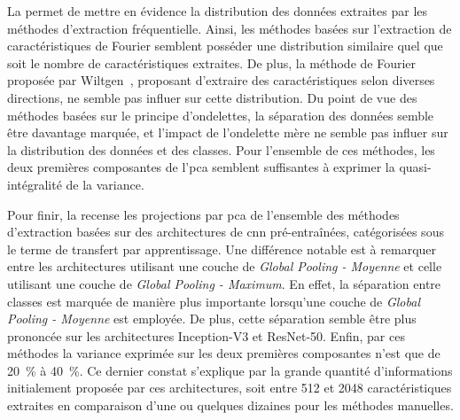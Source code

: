 La  permet de mettre en évidence la distribution des données extraites par les méthodes d'extraction fréquentielle. Ainsi, les méthodes basées sur l'extraction de caractéristiques de Fourier semblent posséder une distribution similaire quel que soit le nombre de caractéristiques extraites. De plus, la méthode de Fourier proposée par Wiltgen~\cite{Wiltgen2008}, proposant d'extraire des caractéristiques selon diverses directions, ne semble pas influer sur cette distribution. Du point de vue des méthodes basées sur le principe d'ondelettes, la séparation des données semble être davantage marquée, et l'impact de l'ondelette mère ne semble pas influer sur la distribution des données et des classes. Pour l'ensemble de ces méthodes, les deux premières composantes de l'\gls{pca} semblent suffisantes à exprimer la quasi-intégralité de la variance.\par

Pour finir, la  recense les projections par \gls{pca} de l'ensemble des méthodes d'extraction basées sur des architectures de \gls{cnn} pré-entraînées, catégorisées sous le terme de transfert par apprentissage. Une différence notable est à remarquer entre les architectures utilisant une couche de \textit{Global Pooling - Moyenne} et celle utilisant une couche de \textit{Global Pooling - Maximum}. En effet, la séparation entre classes est marquée de manière plus importante lorsqu'une couche de \textit{Global Pooling - Moyenne} est employée. De plus, cette séparation semble être plus prononcée sur les architectures Inception-V3 et ResNet-50. Enfin, par ces méthodes la variance exprimée sur les deux premières composantes n'est que de 20~\% à 40~\%. Ce dernier constat s'explique par la grande quantité d'informations initialement proposée par ces architectures, soit entre 512 et 2048 caractéristiques extraites en comparaison d'une ou quelques dizaines pour les méthodes manuelles.\par

